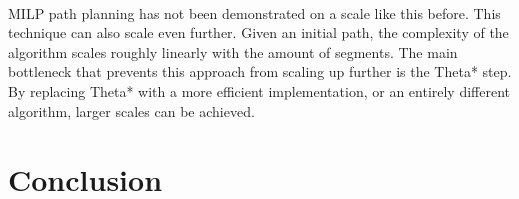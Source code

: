 \\
MILP path planning has not been demonstrated on a scale like this before. This technique can also scale even further. Given an initial path, the complexity of the algorithm scales roughly linearly with the amount of segments. The main bottleneck that prevents this approach from scaling up further is the Theta* step. By replacing Theta* with a more efficient implementation, or an entirely different algorithm, larger scales can be achieved.

\section{Conclusion}